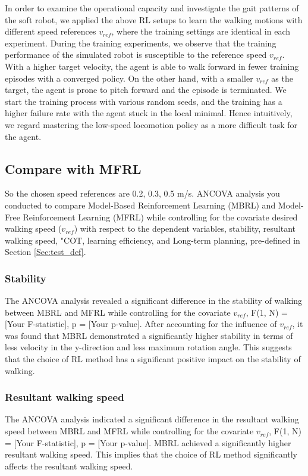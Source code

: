 In order to examine the operational capacity and investigate the gait patterns of the soft robot, we applied the above RL setups to learn the walking motions with different speed references $v_{ref}$, where the training settings are identical in each experiment. During the training experiments, we observe that the training performance of the simulated robot is susceptible to the reference speed $v_{ref}$. With a higher target velocity, the agent is able to walk forward in fewer training episodes with a converged policy. On the other hand, with a smaller $v_{ref}$ as the target, the agent is prone to pitch forward and the episode is terminated. We start the training process with various random seeds, and the training has a higher failure rate with the agent stuck in the local minimal. Hence intuitively, we regard mastering the low-speed locomotion policy as a more difficult task for the agent.
\subsection{Compare with MFRL}
So the chosen speed references are 0.2, 0.3, 0.5 m/s. ANCOVA analysis you conducted to compare Model-Based Reinforcement Learning (MBRL) and Model-Free Reinforcement Learning (MFRL) while controlling for the covariate desired walking speed ($v_{ref}$) with respect to the dependent variables, stability, resultant walking speed, "\ac{COT}, learning efficiency, and Long-term planning, pre-defined in Section \ref{Sec:test_def}. 
\subsubsection*{Stability}
The ANCOVA analysis revealed a significant difference in the stability of walking between MBRL and MFRL while controlling for the covariate $v_{ref}$, F(1, N) = [Your F-statistic], p = [Your p-value]. After accounting for the influence of $v_{ref}$, it was found that MBRL demonstrated a significantly higher stability in terms of less velocity in the y-direction and less maximum rotation angle. This suggests that the choice of RL method has a significant positive impact on the stability of walking.
\subsubsection*{Resultant walking speed}
The ANCOVA analysis indicated a significant difference in the resultant walking speed between MBRL and MFRL while controlling for the covariate $v_{ref}$, F(1, N) = [Your F-statistic], p = [Your p-value]. MBRL achieved a significantly higher resultant walking speed. This implies that the choice of RL method significantly affects the resultant walking speed.
